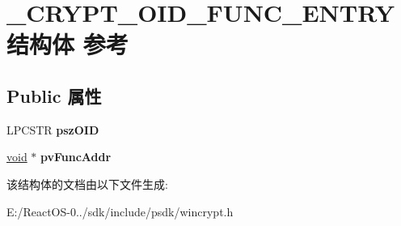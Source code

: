 \hypertarget{struct___c_r_y_p_t___o_i_d___f_u_n_c___e_n_t_r_y}{}\section{\+\_\+\+C\+R\+Y\+P\+T\+\_\+\+O\+I\+D\+\_\+\+F\+U\+N\+C\+\_\+\+E\+N\+T\+R\+Y结构体 参考}
\label{struct___c_r_y_p_t___o_i_d___f_u_n_c___e_n_t_r_y}
\subsection*{Public 属性}
\begin{DoxyCompactItemize}
\item 
\mbox{\label{struct___c_r_y_p_t___o_i_d___f_u_n_c___e_n_t_r_y_ac4f8a8b68883f925f84cb699e66ea139}} 
L\+P\+C\+S\+TR {\bfseries psz\+O\+ID}
\item 
\mbox{\label{struct___c_r_y_p_t___o_i_d___f_u_n_c___e_n_t_r_y_a79f25bdf5c0771b43ff91762fa87ba09}} 
\hyperlink{interfacevoid}{void} $\ast$ {\bfseries pv\+Func\+Addr}
\end{DoxyCompactItemize}


该结构体的文档由以下文件生成\+:\begin{DoxyCompactItemize}
\item 
E\+:/\+React\+O\+S-\/0../sdk/include/psdk/wincrypt.\+h\end{DoxyCompactItemize}
